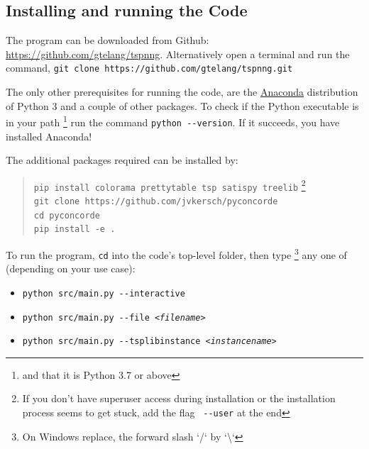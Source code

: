 \newpage

\begin{appendices}
\renewcommand{\thesection}{\Alph{section}}

\section{Installing and running the Code}
\label{sec:install}

The program can be downloaded from Github: \url{https://github.com/gtelang/tspnng}. Alternatively
open a terminal and run the command, \texttt{git clone https://github.com/gtelang/tspnng.git}

The only other prerequisites for running the code, are the 
\href{https://www.anaconda.com/products/individual}{Anaconda} distribution of Python 3 
and a couple of other packages.  To check if the Python executable is in your path \footnote{and that it is Python 3.7 or above}
run the command \verb|python --version|. If it succeeds, you have installed Anaconda! 

The additional packages required can be installed by: 

\begin{quote}
\color{blue}
\texttt{pip install colorama prettytable tsp satispy treelib} \footnote{If you don't have superuser access during installation or the installation process seems to get stuck, add the flag \texttt{\color{red} \texttt{-{}-}user} at the end}   \\
\texttt{git clone https://github.com/jvkersch/pyconcorde} \\
\texttt{cd pyconcorde}\\
\texttt{pip install -e .}
\end{quote}


To run the program, \texttt{cd} into the code's top-level folder, then type \footnote{On Windows replace, the forward slash `/` by `\textbackslash`}
any one of (depending on your use case): 


{\LARGE \color{alizarin}
\begin{itemize}
\item \texttt{python src/main.py \textit{-}\textit{-}interactive}
\item \texttt{python src/main.py \textit{-}\textit{-}file \textit{<filename>}} 
\item \texttt{python src/main.py \textit{-}\textit{-}tsplibinstance \textit{<instancename>}}
\end{itemize}
}


\end{appendices}
